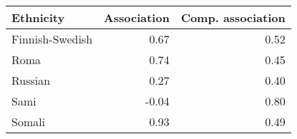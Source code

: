 \begin{tabular}{lrr}
\toprule
      Ethnicity &  Association &  Comp. association \\
\midrule
Finnish-Swedish &         0.67 &               0.52 \\
           Roma &         0.74 &               0.45 \\
        Russian &         0.27 &               0.40 \\
           Sami &        -0.04 &               0.80 \\
         Somali &         0.93 &               0.49 \\
\bottomrule
\end{tabular}
